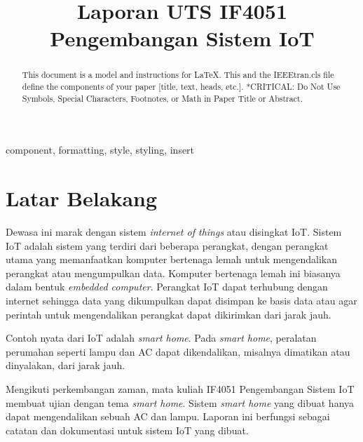 \documentclass[conference]{IEEEtran}
\begin{document}
\renewcommand{\figurename}{Gambar}

\title{Laporan UTS IF4051 Pengembangan Sistem IoT}

\author{
}

\maketitle

\begin{abstract}
This document is a model and instructions for \LaTeX.
This and the IEEEtran.cls file define the components of your paper [title, text, heads, etc.]. *CRITICAL: Do Not Use Symbols, Special Characters, Footnotes, 
or Math in Paper Title or Abstract.
\end{abstract}

\begin{IEEEkeywords}
component, formatting, style, styling, insert
\end{IEEEkeywords}

\section{Latar Belakang}\label{sect-latar_belakang}
Dewasa ini marak dengan sistem \textit{internet of things} a\-tau disingkat IoT.
Sistem IoT adalah sistem yang terdiri dari beberapa perangkat, dengan perangkat
utama yang memanfaatkan komputer bertenaga lemah untuk mengendalikan perangkat
atau mengumpulkan data. Komputer bertenaga lemah ini biasanya dalam bentuk
\textit{embedded computer}. Perangkat IoT dapat terhubung dengan internet sehingga
data yang dikumpulkan dapat disimpan ke basis data atau agar perintah untuk
mengendalikan perangkat dapat dikirimkan dari jarak jauh.

Contoh nyata dari IoT adalah \textit{smart home}. Pada \textit{smart home},
peralatan perumahan seperti lampu dan AC dapat dikendalikan, misalnya dimatikan
atau dinyalakan, dari jarak jauh.

Mengikuti perkembangan zaman, mata kuliah IF4051 Pengembangan Sistem IoT membuat
ujian dengan tema \textit{smart home}. Sistem \textit{smart home} yang dibuat
hanya dapat mengendalikan sebuah AC dan lampu. Laporan ini berfungsi sebagai
catatan dan dokumentasi untuk sistem IoT yang dibuat.
\end{document}
